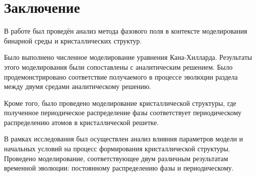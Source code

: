 %
%

\section{Заключение}

В работе был проведён анализ метода фазового поля в контексте моделирования бинарной среды и кристаллических структур.

Было выполнено численное моделирование уравнения Кана-Хилларда. Результаты этого моделирования были сопоставлены с аналитическим решением. Было продемонстрировано соответствие получаемого в процессе эволюции раздела между двумя средами аналитическому решению.

Кроме того, было проведено моделирование кристаллической структуры, где полученное периодическое распределение фазы соответствует периодическому распределению атомов в кристаллической решетке.

В рамках исследования был осуществлен анализ влияния параметров модели и начальных условий на процесс формирования кристаллической структуры. Проведено моделирование, соответствующее двум различным результатам временной эволюции: постоянному распределению фазы и периодическому.
